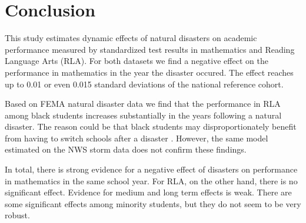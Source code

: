 \section{Conclusion} \label{Conclusion}

This study estimates dynamic effects of natural disasters on academic performance measured by standardized test results in mathematics and Reading Language Arts (RLA). For both datasets we find a negative effect on the performance in mathematics in the year the disaster occured. The effect reaches up to 0.01 or even 0.015 standard deviations of the national reference cohort.

Based on FEMA natural disaster data we find that the performance in RLA among black students increases substantially in the years following a natural disaster. The reason could be that black students may disproportionately benefit from having to switch schools after a disaster \citep{Sacerdote_2012}. However, the same model estimated on the NWS storm data does not confirm these findings.

In total, there is strong evidence for a negative effect of disasters on performance in mathematics in the same school year. For RLA, on the other hand, there is no significant effect. Evidence for medium and long term effects is weak.  There are some significant effects among minority students, but they do not seem to be very robust.
